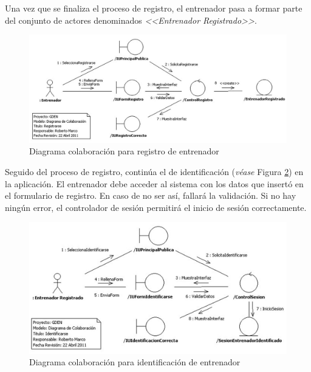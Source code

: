 		Una vez que se finaliza el proceso de registro, el entrenador pasa a formar parte del conjunto de actores denominados {\it <<Entrenador Registrado>>}. 
		
			\begin{figure}[H]
			  \centering
			    \includegraphics[width=16cm]{./eps/colaboraciones/gestion_acceso/RegistrarseEntrenador.eps}
			  \caption{Diagrama colaboración para registro de entrenador}
			  \label{fig:col_registrarse_entrenador}
			\end{figure}
			
		Seguido del proceso de registro, continúa el de identificación ({\it véase} Figura \ref{fig:col_identificarse_entrenador}) en la aplicación. El entrenador debe acceder al sistema con los datos que insertó en el formulario de registro. En caso de no ser así, fallará la validación. Si no hay ningún error, el controlador de sesión permitirá el inicio de sesión correctamente.
		
			\begin{figure}[H]
			  \centering
			    \includegraphics[width=16cm]{./eps/colaboraciones/gestion_acceso/IdentificarseEntrenador.eps}
			  \caption{Diagrama colaboración para identificación de entrenador}
			  \label{fig:col_identificarse_entrenador}
			\end{figure}
		
